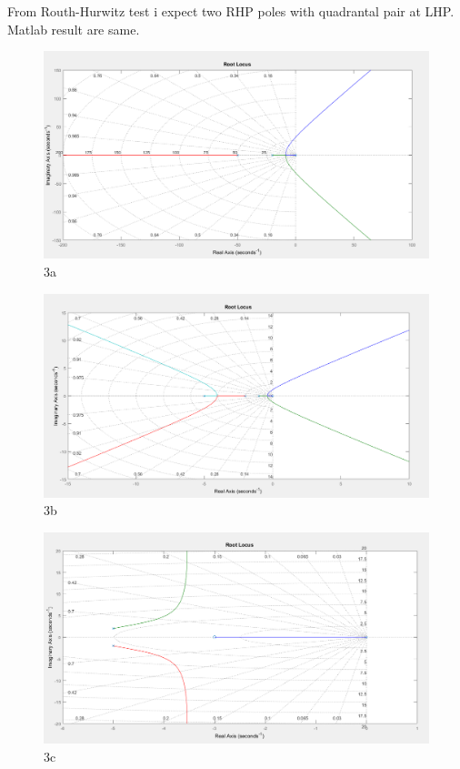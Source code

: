 \documentclass[11pt]{article}
\begin{document}
From Routh-Hurwitz test i expect two RHP poles with quadrantal pair at LHP. Matlab result are same.
\begin{figure}[H]
  \includegraphics[scale=0.7, center]{3a}
  \caption{3a}
  \label{fig:zero}
\end{figure}
\begin{figure}[H]
  \includegraphics[scale=0.7, center]{3b}
  \caption{3b}
  \label{fig:zero}
\end{figure}
\begin{figure}[H]
  \includegraphics[scale=0.7, center]{3c}
  \caption{3c}
  \label{fig:zero}
\end{figure}
\end{document}
